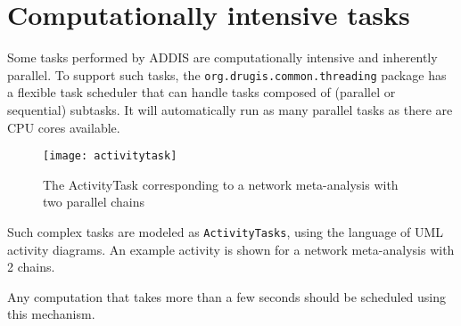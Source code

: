 \documentclass[a4paper]{article}
\begin{document}
\section{Computationally intensive tasks}

Some tasks performed by ADDIS are computationally intensive and inherently parallel.
To support such tasks, the {\tt org.drugis.common.threading} package has a flexible task scheduler that can handle tasks composed of (parallel or sequential) subtasks.
It will automatically run as many parallel tasks as there are CPU cores available.

\begin{figure}[h]
\centering
\texttt{[image: activitytask]}
\caption{The ActivityTask corresponding to a network meta-analysis with two parallel chains}
\end{figure}

Such complex tasks are modeled as {\tt ActivityTasks}, using the language of UML activity diagrams.
An example activity is shown for a network meta-analysis with 2 chains.

Any computation that takes more than a few seconds should be scheduled using this mechanism.
\end{document}
